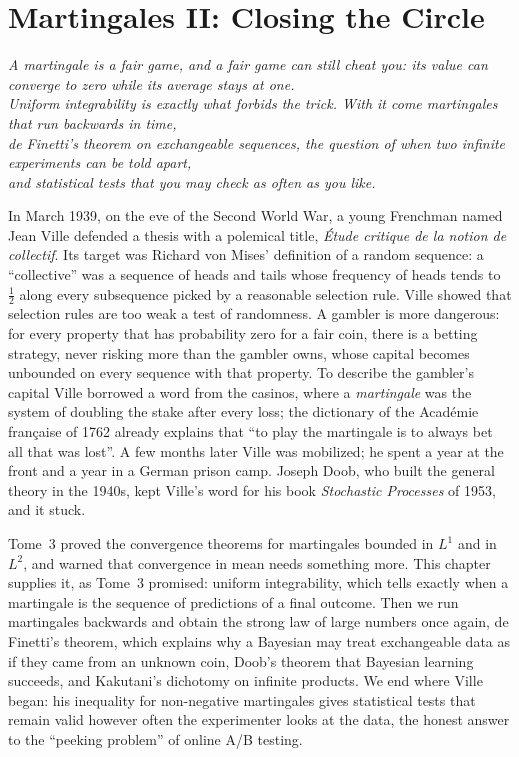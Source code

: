 \chapter{Martingales II: Closing the Circle}
\begin{center}\itshape
A martingale is a fair game, and a fair game can still cheat you: its value can converge to zero while its average stays at one.\\
Uniform integrability is exactly what forbids the trick. With it come martingales that run backwards in time,\\
de Finetti's theorem on exchangeable sequences, the question of when two infinite experiments can be told apart,\\
and statistical tests that you may check as often as you like.
\end{center}

In March 1939, on the eve of the Second World War, a young Frenchman named Jean Ville defended a thesis with a polemical title,
\emph{\'Etude critique de la notion de collectif}. Its target was Richard von Mises' definition of a random sequence: a ``collective'' was a sequence of
heads and tails whose frequency of heads tends to $\frac12$ along every subsequence picked by a reasonable selection rule. Ville showed that selection rules are
too weak a test of randomness. A gambler is more dangerous: for every property that has probability zero for a fair coin, there is a betting strategy, never
risking more than the gambler owns, whose capital becomes unbounded on every sequence with that property. To describe the gambler's capital Ville borrowed a word from the
casinos, where a \emph{martingale} was the system of doubling the stake after every loss; the dictionary of the Acad\'emie fran\c caise of 1762 already explains
that ``to play the martingale is to always bet all that was lost''. A few months later Ville was mobilized; he spent a year at the front and a year in a
German prison camp. Joseph Doob, who built the general theory in the 1940s, kept Ville's word for his book \emph{Stochastic Processes} of 1953, and it stuck.

Tome~3 proved the convergence theorems for martingales bounded in $L^1$ and in $L^2$, and warned that convergence in mean needs something more. This chapter supplies it, as Tome~3 promised:
uniform integrability, which tells exactly when a martingale is the sequence of predictions of a final outcome. Then we run martingales backwards and obtain the strong law of
large numbers once again, de Finetti's theorem, which explains why a Bayesian may treat exchangeable data as if they came from an unknown coin, Doob's theorem that Bayesian
learning succeeds, and Kakutani's dichotomy on infinite products. We end where Ville began: his inequality for non-negative martingales gives statistical tests that remain valid
however often the experimenter looks at the data, the honest answer to the ``peeking problem'' of online A/B testing.


